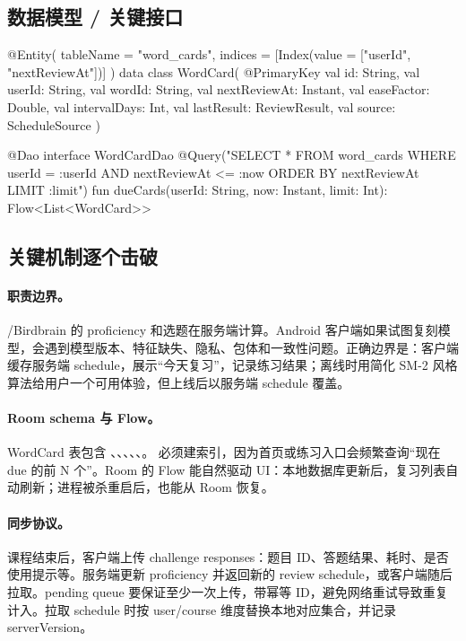 \subsection{数据模型 / 关键接口}

\begin{kotlin}
@Entity(
    tableName = "word_cards",
    indices = [Index(value = ["userId", "nextReviewAt"])]
)
data class WordCard(
    @PrimaryKey val id: String,
    val userId: String,
    val wordId: String,
    val nextReviewAt: Instant,
    val easeFactor: Double,
    val intervalDays: Int,
    val lastResult: ReviewResult,
    val source: ScheduleSource
)

@Dao
interface WordCardDao {
    @Query("SELECT * FROM word_cards WHERE userId = :userId AND nextReviewAt <= :now ORDER BY nextReviewAt LIMIT :limit")
    fun dueCards(userId: String, now: Instant, limit: Int): Flow<List<WordCard>>
}
\end{kotlin}

\subsection{关键机制逐个击破}

\paragraph{职责边界。} \srcofficial/\srccommunity Birdbrain 的 proficiency 和选题在服务端计算。\srcinferred Android 客户端如果试图复刻模型，会遇到模型版本、特征缺失、隐私、包体和一致性问题。正确边界是：客户端缓存服务端 schedule，展示“今天复习”，记录练习结果；离线时用简化 SM-2 风格算法给用户一个可用体验，但上线后以服务端 schedule 覆盖。

\paragraph{Room schema 与 Flow。} WordCard 表包含 、、、、、。\srcinferred {} 必须建索引，因为首页或练习入口会频繁查询“现在 due 的前 N 个”。Room 的 Flow 能自然驱动 UI：本地数据库更新后，复习列表自动刷新；进程被杀重启后，也能从 Room 恢复。

\paragraph{同步协议。} 课程结束后，客户端上传 challenge responses：题目 ID、答题结果、耗时、是否使用提示等。服务端更新 proficiency 并返回新的 review schedule，或客户端随后拉取。\srcinferred pending queue 要保证至少一次上传，带幂等 ID，避免网络重试导致重复计入。拉取 schedule 时按 user/course 维度替换本地对应集合，并记录 serverVersion。

